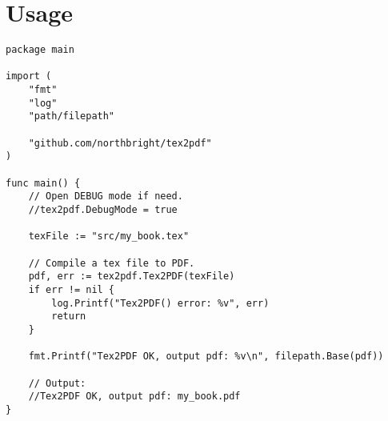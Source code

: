 \section{Usage}

\begin{verbatim}
package main

import (
	"fmt"
	"log"
	"path/filepath"

	"github.com/northbright/tex2pdf"
)

func main() {
	// Open DEBUG mode if need.
	//tex2pdf.DebugMode = true

	texFile := "src/my_book.tex"

	// Compile a tex file to PDF.
	pdf, err := tex2pdf.Tex2PDF(texFile)
	if err != nil {
		log.Printf("Tex2PDF() error: %v", err)
		return
	}

	fmt.Printf("Tex2PDF OK, output pdf: %v\n", filepath.Base(pdf))

	// Output:
	//Tex2PDF OK, output pdf: my_book.pdf
}
\end{verbatim}
